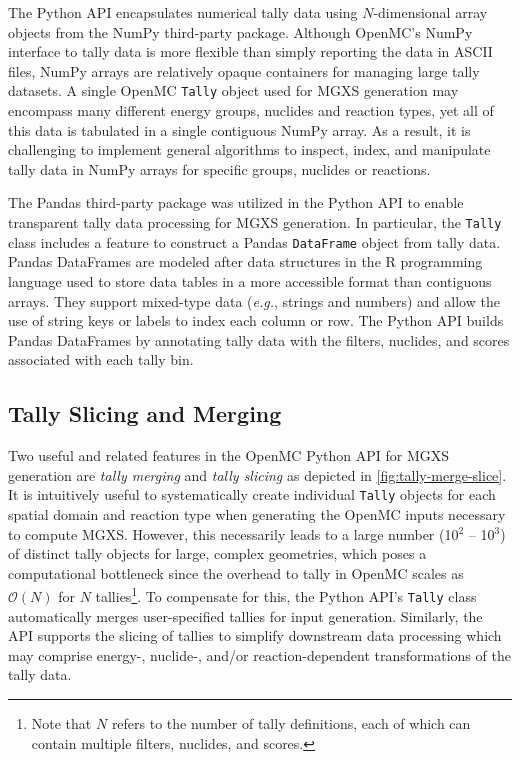 The Python API encapsulates numerical tally data using $N$-dimensional array objects from the NumPy third-party package\cite{walt2011numpy}. Although OpenMC's NumPy interface to tally data is more flexible than simply reporting the data in ASCII files, NumPy arrays are relatively opaque containers for managing large tally datasets. A single OpenMC \texttt{Tally} object used for MGXS generation may encompass many different energy groups, nuclides and reaction types, yet all of this data is tabulated in a single contiguous NumPy array. As a result, it is challenging to implement general algorithms to inspect, index, and manipulate tally data in NumPy arrays for specific groups, nuclides or reactions.

The Pandas third-party package\cite{mckinney2010pandas} was utilized in the Python API to enable transparent tally data processing for MGXS generation. In particular, the \texttt{Tally} class includes a feature to construct a Pandas \texttt{DataFrame} object from tally data. Pandas DataFrames are modeled after data structures in the \textsf{R} programming language used to store data tables in a more accessible format than contiguous arrays. They support mixed-type data (\textit{e.g.}, strings and numbers) and allow the use of string keys or labels to index each column or row. The Python API builds Pandas DataFrames by annotating tally data with the filters, nuclides, and scores associated with each tally bin.

\subsection{Tally Slicing and Merging}
\label{subsec:tally-slice-merge}

Two useful and related features in the OpenMC Python API for MGXS generation are \emph{tally merging} and \emph{tally slicing} as depicted in \cref{fig:tally-merge-slice}. It is intuitively useful to systematically create individual \texttt{Tally} objects for each spatial domain and reaction type when generating the OpenMC inputs necessary to compute MGXS. However, this necessarily leads to a large number (10$^2$ -- 10$^3$) of distinct tally objects for large, complex geometries, which poses a computational bottleneck since the overhead to tally in OpenMC scales as $\mathcal{O}(N)$ for $N$ tallies\footnote{Note that $N$ refers to the number of tally definitions, each of which can contain multiple filters, nuclides, and scores.}. To compensate for this, the Python API's \texttt{Tally} class automatically merges user-specified tallies for input generation. Similarly, the API supports the slicing of tallies to simplify downstream data processing which may comprise energy-, nuclide-, and/or reaction-dependent transformations of the tally data.

